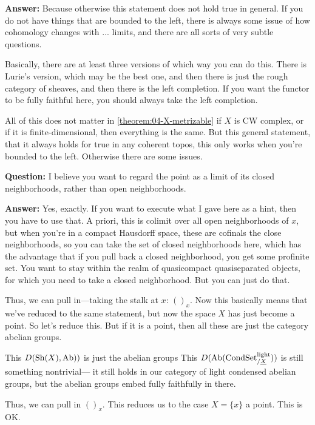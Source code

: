 \textbf{Answer:} Because otherwise this statement does not hold true in general. 
If you do not have things that are bounded to the left, there is always some issue of how cohomology changes with ... limits, and there are all sorts of very subtle questions. 

Basically, there are at least three versions of which way you can do this. 
There is Lurie's version, which may be the best one, and then there is just the rough category of sheaves, and then there is the left completion. 
If you want the functor to be fully faithful here, you should always take the left completion.

All of this does not matter in \ref{theorem:04-X-metrizable} if $X$ is CW complex, or if it is finite-dimensional, then everything is the same. 
But this general statement, that it always holds for true in any coherent topos, this only works when you're bounded to the left. Otherwise there are some issues. 

\textbf{Question:} I believe you want to regard the point as a limit of its closed neighborhoods, rather than open neighborhoods.

\textbf{Answer:} Yes, exactly. If you want to execute what I gave here as a hint, then you have to use that. A priori, this is colimit over all open neighborhoods of $x$, but when you're in a compact Hausdorff space, these are cofinals the close neighborhoods, so you can take the set of closed neighborhoods here, which has the advantage that if you pull back a closed neighborhood, you get some profinite set. 
You want to stay within the realm of quasicompact quasiseparated objects, for which you need to take a closed neighborhood. 
But you can just do that.

Thus, we can pull in---taking the stalk at $x$: $( )_x$. %
Now this basically means that we've reduced to the same statement, but now the space $X$ has just become a point. 
So let's reduce this. But if it is a point, then all these are just the category abelian groups. 

This $D(\operatorname{Sh}(X),\mathrm{Ab}))$ is just the abelian groups
This $D(\mathrm{Ab}(\mathrm{Cond}\mathrm{Set}_{/\underline{X}}^{\mathrm{light}}))$ is still something nontrivial--- it still holds in our category of light condensed abelian groups, but the abelian groups embed fully faithfully in there. 

Thus, we can pull in $(  )_x$. This reduces us to the case $X = \{ x \}$ a point. This is OK.

